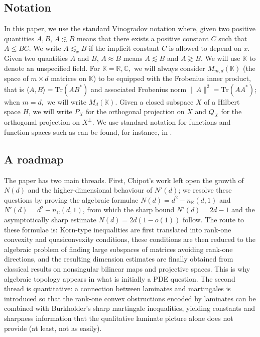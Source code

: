\documentclass[11pt, a4paper, reqno]{elsarticle}
\theoremstyle{definition}
\theoremstyle{remark}
\begin{document}
\subsection{Notation}
In this paper, we use the standard Vinogradov notation where,
given two positive quantities $A,B$,
$A\lesssim B$ means that there exists a positive constant 
$C$ such that $A\le BC$. 
We write $A\lesssim_x B$ if the implicit constant $C$ is allowed to depend on $x$. 
Given two quantities $A$ and $B$, $A\approx B$ means $A \lesssim B$
and $A\gtrsim B$.
We will use $\mathbb K$ to denote an unspecified
field.
For $\mathbb K=\mathbb{R},\mathbb{C},$ we will always consider 
$M_{m,d}(\mathbb K)$ (the space of $m\times d$ matrices 
on $\mathbb K$) to be equipped with the Frobenius inner 
product, that is $\langle A,B\rangle=\mathrm{Tr}(AB^*)$ and associated Frobenius norm $\|A\|^2=\mathrm{Tr}(AA^*)$; when $m=d,$ we will write $M_{d}(\mathbb K)$.
Given a closed subspace $X$ of a Hilbert space $H$, we will write $P_X$
for the orthogonal projection on $X$ and $Q_X$ for the orthogonal projection on $X^\perp$. We use standard notation for functions and
function spaces such as can be found, for instance, in \cite{Dacorogna2004IntroductionVariations}.
\subsection{A roadmap}
The paper has two main threads. First, Chipot's work left open the
growth of $N(d)$ and the higher-dimensional behaviour of $N'(d)$;
we resolve these questions by proving the algebraic formulae
$N(d)=d^2-n_{\mathbb R}(d,1)$ and
$N'(d)=d^2-n_{\mathbb C}(d,1)$, from which the sharp bound
$N'(d)=2d-1$ and the asymptotically sharp estimate
$N(d)=2d(1-o(1))$ follow. The route to these formulae is:
Korn-type inequalities are first translated into rank-one convexity
and quasiconvexity conditions, these conditions are then reduced to
the algebraic problem of finding large subspaces of matrices avoiding
rank-one directions, and the resulting dimension estimates are finally
obtained from classical results on nonsingular bilinear maps and
projective spaces. This is why algebraic topology appears in what is
initially a PDE question. The second thread is quantitative: a
connection between laminates and martingales is introduced so that the
rank-one convex obstructions encoded by laminates can be combined with
Burkholder's sharp martingale inequalities, yielding constants and
sharpness information that the qualitative laminate picture alone does
not provide (at least, not as easily).
\end{document}
